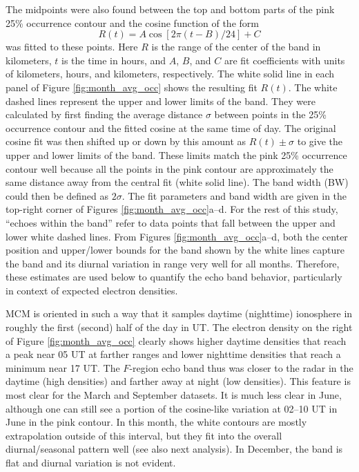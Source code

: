 The midpoints were also found between the top and bottom parts of the pink 25\% occurrence contour and the cosine function of the form
\begin{equation}\label{E:Model}
R\left(t\right) = A \cos\left[2\pi\left(t-B\right)/24\right] + C
\end{equation}
was fitted to these points. Here \(R\) is the range of the center of the band in kilometers, \(t\) is the time in hours, and  \(A\), \(B\), and \(C\) are fit coefficients with units of kilometers, hours, and kilometers, respectively. The white solid line in each panel of Figure \ref{fig:month_avg_occ} shows the resulting fit \(R\left(t\right)\). The white dashed lines represent the upper and lower limits of the band.  They were calculated by first finding the average distance \(\sigma\) between points in the 25\% occurrence contour and the fitted cosine at the same time of day. The original cosine fit was then shifted up or down by this amount as \(R\left(t\right) \pm \sigma\) to give the upper and lower limits of the band.  These limits match the pink 25\% occurrence contour well because all the points in the pink contour are approximately the same distance away from the central fit (white solid line). The band width (BW) could then be defined as \(2\sigma\). The fit parameters and band width are given in the top-right corner of Figures \ref{fig:month_avg_occ}a--d. For the rest of this study, ``echoes within the band'' refer to data points that fall between the upper and lower white dashed lines. From Figures \ref{fig:month_avg_occ}a--d, both the center position and upper/lower bounds for the band shown by the white lines capture the band and its diurnal variation in range very well for all months. Therefore, these estimates are used below to quantify the echo band behavior, particularly in context of expected electron densities.

MCM is oriented in such a way that it samples daytime (nighttime) ionosphere in roughly the first (second) half of the day in UT. The electron density on the right of Figure \ref{fig:month_avg_occ} clearly shows higher daytime densities that reach a peak near 05 UT at farther ranges and lower nighttime densities that reach a minimum near 17 UT. The \(F\)-region echo band thus was closer to the radar in the daytime (high densities) and farther away at night (low densities). This feature is most clear for the March and September datasets. It is much less clear in June, although one can still see a portion of the cosine-like variation at 02--10 UT in June in the pink contour. In this month, the white contours are mostly extrapolation outside of this interval, but they fit into the overall diurnal/seasonal pattern well (see also next analysis).  In December, the band is flat and diurnal variation is not evident.

